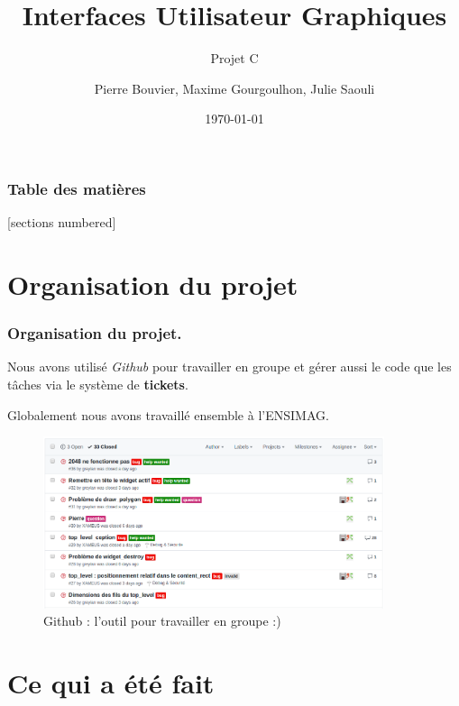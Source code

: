 \documentclass[10pt]{beamer}
\title{Interfaces Utilisateur Graphiques}
\subtitle{Projet C}
\date{\today}
\author{Pierre Bouvier, Maxime Gourgoulhon, Julie Saouli}
\institute{Ensimag}
\begin{document}
\maketitle

\begin{frame}
  \frametitle{Table des matières}
  [sections numbered]
  \tableofcontents[hideallsubsections]
\end{frame}

\section{Organisation du projet}

\begin{frame}[fragile]
	\frametitle{Organisation du projet.}

    Nous avons utilisé \emph{Github} pour travailler en groupe et gérer aussi le code que les tâches via le système de \textbf{tickets}.

    Globalement nous avons travaillé ensemble à l'ENSIMAG.

    \begin{center}
    \begin{figure}
	   \includegraphics[width=10cm]{capture0.png}
    	\caption{Github : l'outil pour travailler en groupe :)}
    \end{figure}
    \end{center}

\end{frame}

\section{Ce qui a été fait}
\end{document}
